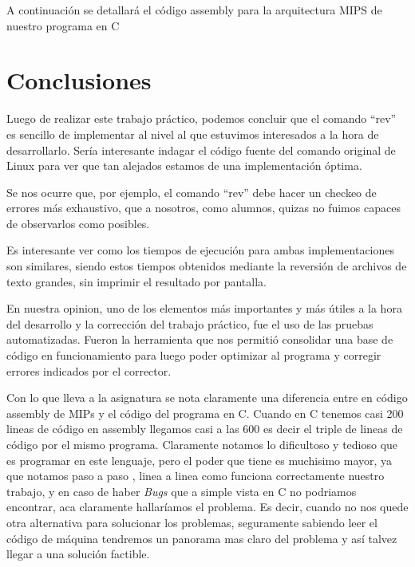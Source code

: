 \documentclass{article}
\begin{document}
A continuaci\'on se detallará el c\'odigo assembly para la arquitectura MIPS de nuestro programa en C



\section{Conclusiones}

Luego de realizar este trabajo práctico, podemos concluir que el comando ``rev'' es sencillo de implementar al nivel al que estuvimos interesados a la hora de desarrollarlo. Sería interesante indagar el c\'odigo fuente del comando original de Linux para ver que tan alejados estamos de una implementación óptima.

Se nos ocurre que, por ejemplo, el comando ``rev'' debe hacer un checkeo de errores más exhaustivo, que a nosotros, como alumnos, quizas no fuimos capaces de observarlos como posibles.

Es interesante ver como los tiempos de ejecución para ambas implementaciones son similares, siendo estos tiempos obtenidos mediante la reversión de archivos de texto grandes, sin imprimir el resultado por pantalla.

En nuestra opinion, uno de los elementos más importantes y más útiles a la hora del desarrollo y la corrección del trabajo práctico, fue el uso de las pruebas automatizadas. Fueron la herramienta que nos permitió consolidar una base de código en funcionamiento para luego poder optimizar al programa y corregir errores indicados por el corrector.

Con lo que lleva a la asignatura se nota claramente una diferencia entre en c\'odigo assembly de MIPs y el c\'odigo del programa en C. Cuando en C tenemos casi 200 lineas de c\'odigo en assembly llegamos casi a las 600 es decir el triple de lineas de c\'odigo por el mismo programa. Claramente notamos lo dificultoso y tedioso que es programar en este lenguaje, pero el poder que tiene es muchisimo mayor, ya que notamos paso a paso , linea a linea como funciona correctamente nuestro trabajo, y en caso de haber \textit{Bugs} que a simple vista en C no podriamos encontrar, aca claramente hallar\'iamos el problema. Es decir, cuando no nos quede otra alternativa para solucionar los problemas, seguramente sabiendo leer el c\'odigo de m\'aquina tendremos un panorama mas claro del problema y as\'i talvez llegar a una soluci\'on factible.
\end{document}
